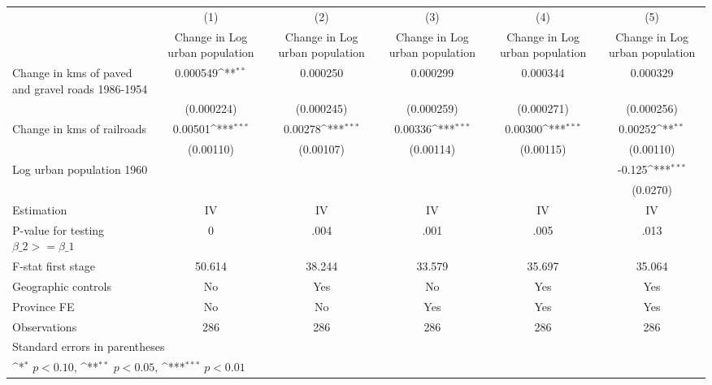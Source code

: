 {
\def\sym#1{\ifmmode^{#1}\else\(^{#1}\)\fi}
\begin{tabular}{l*{5}{c}}
\hline\hline
                    &\multicolumn{1}{c}{(1)}&\multicolumn{1}{c}{(2)}&\multicolumn{1}{c}{(3)}&\multicolumn{1}{c}{(4)}&\multicolumn{1}{c}{(5)}\\
                    &\multicolumn{1}{c}{Change in Log urban population}&\multicolumn{1}{c}{Change in Log urban population}&\multicolumn{1}{c}{Change in Log urban population}&\multicolumn{1}{c}{Change in Log urban population}&\multicolumn{1}{c}{Change in Log urban population}\\
\hline
Change in kms of paved and gravel roads 1986-1954&    0.000549\sym{**} &    0.000250         &    0.000299         &    0.000344         &    0.000329         \\
                    &  (0.000224)         &  (0.000245)         &  (0.000259)         &  (0.000271)         &  (0.000256)         \\
[1em]
Change in kms of railroads&     0.00501\sym{***}&     0.00278\sym{***}&     0.00336\sym{***}&     0.00300\sym{***}&     0.00252\sym{**} \\
                    &   (0.00110)         &   (0.00107)         &   (0.00114)         &   (0.00115)         &   (0.00110)         \\
[1em]
Log urban population 1960&                     &                     &                     &                     &      -0.125\sym{***}\\
                    &                     &                     &                     &                     &    (0.0270)         \\
\hline
Estimation          &          IV         &          IV         &          IV         &          IV         &          IV         \\
P-value for testing $\beta\_2 >= \beta\_1$&           0         &        .004         &        .001         &        .005         &        .013         \\
F-stat first stage  &      50.614         &      38.244         &      33.579         &      35.697         &      35.064         \\
Geographic controls &          No         &         Yes         &          No         &         Yes         &         Yes         \\
Province FE         &          No         &          No         &         Yes         &         Yes         &         Yes         \\
Observations        &         286         &         286         &         286         &         286         &         286         \\
\hline\hline
\multicolumn{6}{l}{\footnotesize Standard errors in parentheses}\\
\multicolumn{6}{l}{\footnotesize \sym{*} \(p<0.10\), \sym{**} \(p<0.05\), \sym{***} \(p<0.01\)}\\
\end{tabular}
}
